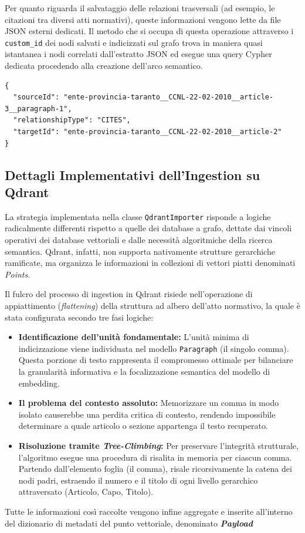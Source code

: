 Per quanto riguarda il salvataggio delle relazioni trasversali (ad esempio, le citazioni tra diversi atti normativi), queste informazioni vengono lette da file JSON esterni dedicati. 
Il metodo che si occupa di questa operazione attraverso i \texttt{custom\_id} dei nodi salvati e indicizzati sul grafo trova in maniera quasi istantanea i nodi correlati dall'estratto JSON ed esegue una query Cypher dedicata procedendo alla creazione dell'arco semantico.

\begin{lstlisting}[caption={Esempio di relazione estratta in formato JSON}, label={lst:json-cites}, breaklines=true]
{
  "sourceId": "ente-provincia-taranto__CCNL-22-02-2010__article-3__paragraph-1",
  "relationshipType": "CITES",
  "targetId": "ente-provincia-taranto__CCNL-22-02-2010__article-2"
}
\end{lstlisting}


\subsection{Dettagli Implementativi dell'Ingestion su Qdrant}
La strategia implementata nella classe \texttt{QdrantImporter} risponde a logiche radicalmente differenti rispetto a quelle dei database a grafo, dettate dai vincoli operativi dei database vettoriali e dalle necessità algoritmiche della ricerca semantica. Qdrant, infatti, non supporta nativamente strutture gerarchiche ramificate, ma organizza le informazioni in collezioni di vettori piatti denominati \textit{Points}.

Il fulcro del processo di ingestion in Qdrant risiede nell'operazione di appiattimento (\textit{flattening}) della struttura ad albero dell'atto normativo, la quale è stata configurata secondo tre fasi logiche:

\begin{itemize}
    \item \textbf{Identificazione dell'unità fondamentale:} L'unità minima di indicizzazione viene individuata nel modello \texttt{Paragraph} (il singolo comma). Questa porzione di testo rappresenta il compromesso ottimale per bilanciare la granularità informativa e la focalizzazione semantica del modello di embedding.
    \item \textbf{Il problema del contesto assoluto:} Memorizzare un comma in modo isolato causerebbe una perdita critica di contesto, rendendo impossibile determinare a quale articolo o sezione appartenga il testo recuperato.
    \item \textbf{Risoluzione tramite \textit{Tree-Climbing}:} Per preservare l'integrità strutturale, l'algoritmo esegue una procedura di risalita in memoria per ciascun comma. Partendo dall'elemento foglia (il comma), risale ricorsivamente la catena dei nodi padri, estraendo il numero e il titolo di ogni livello gerarchico attraversato (Articolo, Capo, Titolo).
\end{itemize}
Tutte le informazioni così raccolte vengono infine aggregate e inserite all'interno del dizionario di metadati del punto vettoriale, denominato \textbf{\textit{Payload}}

